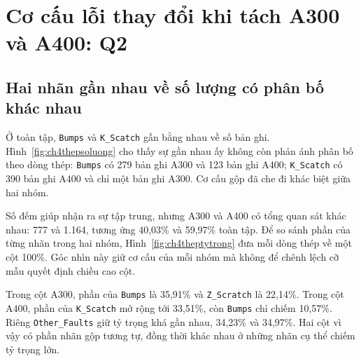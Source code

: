 \documentclass[12pt,a4paper,oneside]{report}
\newcommand{\maCot}[1]{{\urlstyle{tt}\def\UrlBreaks{\do\_\do\/\do\.}\def\UrlBigBreaks{}\nolinkurl{#1}}}
\begin{document}
\section{Cơ cấu lỗi thay đổi khi tách A300 và A400: Q2}
\label{sec:ch4q2}

\subsection{Hai nhãn gần nhau về số lượng có phân bố khác nhau}

Ở toàn tập, \maCot{Bumps} và \maCot{K_Scatch} gần bằng nhau về số bản ghi. Hình~\ref{fig:ch4thepsoluong} cho thấy sự gần nhau ấy không còn phản ánh phân bố theo dòng thép: \maCot{Bumps} có 279 bản ghi A300 và 123 bản ghi A400; \maCot{K_Scatch} có 390 bản ghi A400 và chỉ một bản ghi A300. Cơ cấu gộp đã che đi khác biệt giữa hai nhóm.

\begin{center}\begin{minipage}{\linewidth}
\centering
{}
\label{fig:ch4thepsoluong}
\end{minipage}\end{center}

Số đếm giúp nhận ra sự tập trung, nhưng A300 và A400 có tổng quan sát khác nhau: 777 và 1.164, tương ứng 40,03\% và 59,97\% toàn tập. Để so sánh phần của từng nhãn trong hai nhóm, Hình~\ref{fig:ch4theptytrong} đưa mỗi dòng thép về một cột 100\%. Góc nhìn này giữ cơ cấu của mỗi nhóm mà không để chênh lệch cỡ mẫu quyết định chiều cao cột.

\begin{center}\begin{minipage}{\linewidth}
\centering
{}
\label{fig:ch4theptytrong}
\end{minipage}\end{center}

Trong cột A300, phần của \maCot{Bumps} là 35,91\% và \maCot{Z_Scratch} là 22,14\%. Trong cột A400, phần của \maCot{K_Scatch} mở rộng tới 33,51\%, còn \maCot{Bumps} chỉ chiếm 10,57\%. Riêng \maCot{Other_Faults} giữ tỷ trọng khá gần nhau, 34,23\% và 34,97\%. Hai cột vì vậy có phần nhãn gộp tương tự, đồng thời khác nhau ở những nhãn cụ thể chiếm tỷ trọng lớn.
\end{document}
